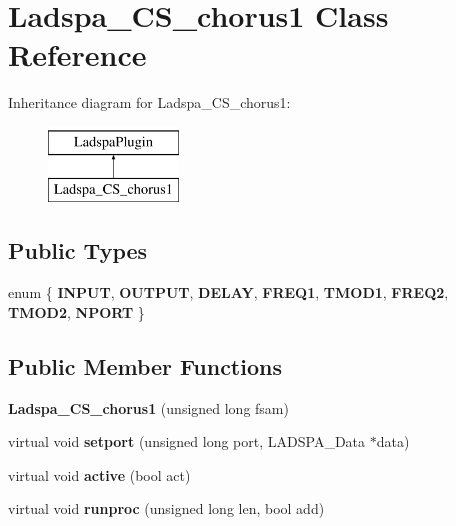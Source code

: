 \hypertarget{class_ladspa___c_s__chorus1}{}\section{Ladspa\+\_\+\+C\+S\+\_\+chorus1 Class Reference}
\label{class_ladspa___c_s__chorus1}
Inheritance diagram for Ladspa\+\_\+\+C\+S\+\_\+chorus1\+:\begin{figure}[H]
\begin{center}
\leavevmode
\includegraphics[height=2.000000cm]{class_ladspa___c_s__chorus1}
\end{center}
\end{figure}
\subsection*{Public Types}
\begin{DoxyCompactItemize}
\item 
\mbox{\label{class_ladspa___c_s__chorus1_a83a74a525acd7efa4df2abdb8311b14f}} 
enum \{ \newline
{\bfseries I\+N\+P\+UT}, 
{\bfseries O\+U\+T\+P\+UT}, 
{\bfseries D\+E\+L\+AY}, 
{\bfseries F\+R\+E\+Q1}, 
\newline
{\bfseries T\+M\+O\+D1}, 
{\bfseries F\+R\+E\+Q2}, 
{\bfseries T\+M\+O\+D2}, 
{\bfseries N\+P\+O\+RT}
 \}
\end{DoxyCompactItemize}
\subsection*{Public Member Functions}
\begin{DoxyCompactItemize}
\item 
\mbox{\label{class_ladspa___c_s__chorus1_aeae8f80f9a176ca76bb1c93e21eb7ace}} 
{\bfseries Ladspa\+\_\+\+C\+S\+\_\+chorus1} (unsigned long fsam)
\item 
\mbox{\label{class_ladspa___c_s__chorus1_abc75a31674dce641586ce8e73fdd7aa1}} 
virtual void {\bfseries setport} (unsigned long port, L\+A\+D\+S\+P\+A\+\_\+\+Data $\ast$data)
\item 
\mbox{\label{class_ladspa___c_s__chorus1_a35995cbf831c1a8682d06aea20d13de9}} 
virtual void {\bfseries active} (bool act)
\item 
\mbox{\label{class_ladspa___c_s__chorus1_a35ce1465ede8abc8852f4840b20c8b39}} 
virtual void {\bfseries runproc} (unsigned long len, bool add)
\end{DoxyCompactItemize}


